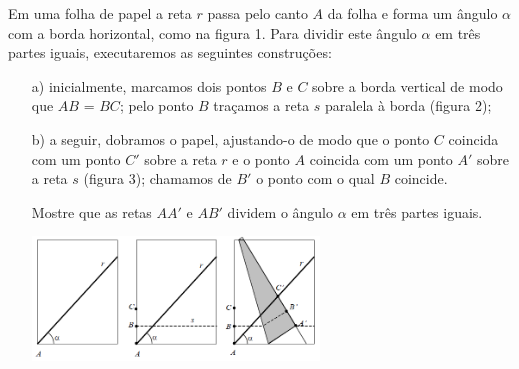 Em uma folha de papel a reta $r$ passa pelo canto $A$ da folha e forma um ângulo $\alpha$ com a borda horizontal, como na figura 1.
Para dividir este ângulo $\alpha$ em três partes iguais, executaremos as
seguintes construções:

\begin{itemize}
\item[a)] inicialmente, marcamos dois pontos $B$ e $C$ sobre a borda vertical de modo que $AB$ = $BC$; pelo ponto $B$ traçamos a reta $s$ paralela à borda (figura 2);

\item[b)] a seguir, dobramos o papel, ajustando-o de modo que o ponto $C$ coincida com um ponto $C'$ sobre a reta $r$ e o ponto $A$ coincida com um ponto $A'$ sobre a reta $s$ (figura 3); chamamos de $B'$ o ponto com o qual $B$ coincide.

Mostre que as retas $AA'$ e $AB'$ dividem o ângulo $\alpha$ em três partes iguais.

\begin{center}
\includegraphics[width = 0.6\textwidth]{figura.png}
\end{center}

\end{itemize}